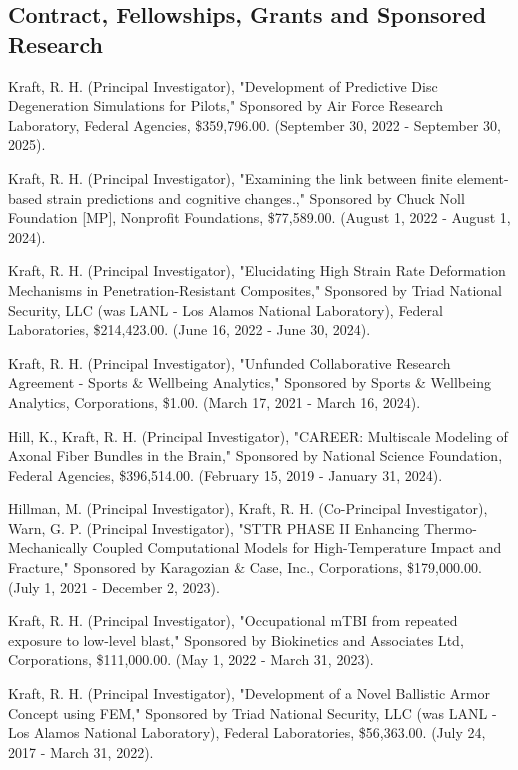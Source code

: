 \documentclass[
]{article}
\begin{document}
\subsection{Contract, Fellowships, Grants and Sponsored
Research}\label{contract-fellowships-grants-and-sponsored-research}

Kraft, R. H. (Principal Investigator), "Development of Predictive Disc
Degeneration Simulations for Pilots," Sponsored by Air Force Research
Laboratory, Federal Agencies, \$359,796.00. (September 30, 2022 -
September 30, 2025).

Kraft, R. H. (Principal Investigator), "Examining the link between
finite element-based strain predictions and cognitive changes.,"
Sponsored by Chuck Noll Foundation {[}MP{]}, Nonprofit Foundations,
\$77,589.00. (August 1, 2022 - August 1, 2024).

Kraft, R. H. (Principal Investigator), "Elucidating High Strain Rate
Deformation Mechanisms in Penetration-Resistant Composites," Sponsored
by Triad National Security, LLC (was LANL - Los Alamos National
Laboratory), Federal Laboratories, \$214,423.00. (June 16, 2022 - June
30, 2024).

Kraft, R. H. (Principal Investigator), "Unfunded Collaborative Research
Agreement - Sports \& Wellbeing Analytics," Sponsored by Sports \&
Wellbeing Analytics, Corporations, \$1.00. (March 17, 2021 - March 16,
2024).

Hill, K., Kraft, R. H. (Principal Investigator), "CAREER: Multiscale
Modeling of Axonal Fiber Bundles in the Brain," Sponsored by National
Science Foundation, Federal Agencies, \$396,514.00. (February 15, 2019 -
January 31, 2024).

Hillman, M. (Principal Investigator), Kraft, R. H. (Co-Principal
Investigator), Warn, G. P. (Principal Investigator), "STTR PHASE II
Enhancing Thermo-Mechanically Coupled Computational Models for
High-Temperature Impact and Fracture," Sponsored by Karagozian \& Case,
Inc., Corporations, \$179,000.00. (July 1, 2021 - December 2, 2023).

Kraft, R. H. (Principal Investigator), "Occupational mTBI from repeated
exposure to low-level blast," Sponsored by Biokinetics and Associates
Ltd, Corporations, \$111,000.00. (May 1, 2022 - March 31, 2023).

Kraft, R. H. (Principal Investigator), "Development of a Novel Ballistic
Armor Concept using FEM," Sponsored by Triad National Security, LLC (was
LANL - Los Alamos National Laboratory), Federal Laboratories,
\$56,363.00. (July 24, 2017 - March 31, 2022).
\end{document}
